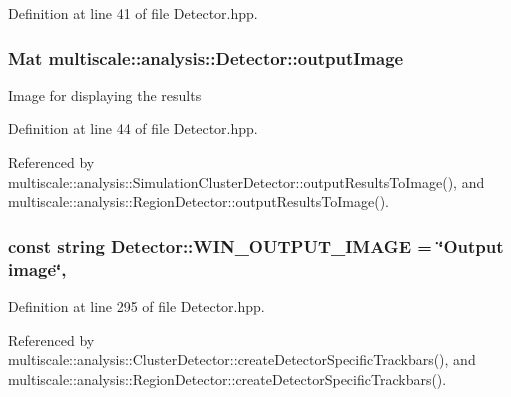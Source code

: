 Definition at line 41 of file Detector.\-hpp.

\hypertarget{classmultiscale_1_1analysis_1_1Detector_a144e080a3af03c9bf3d8a80315823c86}{
\subsubsection[{output\-Image}]{\setlength{\rightskip}{0pt plus 5cm}Mat multiscale\-::analysis\-::\-Detector\-::output\-Image\hspace{0.3cm}{\ttfamily [protected]}}}\label{classmultiscale_1_1analysis_1_1Detector_a144e080a3af03c9bf3d8a80315823c86}
Image for displaying the results 

Definition at line 44 of file Detector.\-hpp.



Referenced by multiscale\-::analysis\-::\-Simulation\-Cluster\-Detector\-::output\-Results\-To\-Image(), and multiscale\-::analysis\-::\-Region\-Detector\-::output\-Results\-To\-Image().

\hypertarget{classmultiscale_1_1analysis_1_1Detector_a883b5de8d273a2bfab31e45bc285c78d}{
\subsubsection[{W\-I\-N\-\_\-\-O\-U\-T\-P\-U\-T\-\_\-\-I\-M\-A\-G\-E}]{\setlength{\rightskip}{0pt plus 5cm}const string Detector\-::\-W\-I\-N\-\_\-\-O\-U\-T\-P\-U\-T\-\_\-\-I\-M\-A\-G\-E = \char`\"{}Output {\bf image}\char`\"{}\hspace{0.3cm}{\ttfamily [static]}, {\ttfamily [protected]}}}\label{classmultiscale_1_1analysis_1_1Detector_a883b5de8d273a2bfab31e45bc285c78d}


Definition at line 295 of file Detector.\-hpp.



Referenced by multiscale\-::analysis\-::\-Cluster\-Detector\-::create\-Detector\-Specific\-Trackbars(), and multiscale\-::analysis\-::\-Region\-Detector\-::create\-Detector\-Specific\-Trackbars().

